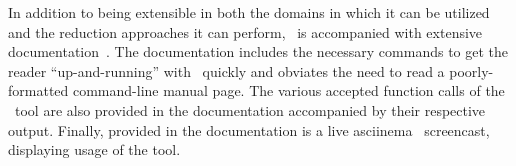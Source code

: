 
In addition to being extensible in both the domains in which it can be utilized and the
reduction approaches it can perform, \mr~is accompanied with extensive documentation~\cite{tool}.
The documentation includes the necessary commands to get the reader ``up-and-running''
with \mr~quickly and obviates the need to read a poorly-formatted command-line manual page.
The various accepted function calls of the \mr~tool are also provided in the documentation
accompanied by their respective output. Finally, provided in the documentation is a live
asciinema~\cite{asciinema} screencast, displaying usage of the tool.






% 
% 
% 
